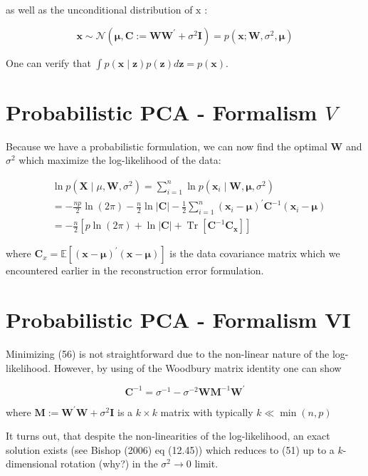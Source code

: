 \documentclass[11pt]{article}
\theoremstyle{plain} %
\theoremstyle{remark}
\begin{document}
as well as the unconditional distribution of $\mathrm{x}$ :

$$
\mathbf{x} \sim \mathcal{N}\left(\boldsymbol{\mu}, \mathbf{C}:=\mathbf{W} \mathbf{W}^{\prime}+\sigma^{2} \mathbf{I}\right)=p\left(\mathbf{x} ; \mathbf{W}, \sigma^{2}, \boldsymbol{\mu}\right)
$$

One can verify that $\int p(\mathbf{x} \mid \mathbf{z}) p(\mathbf{z}) d \mathbf{z}=p(\mathbf{x})$.

\section*{Probabilistic PCA - Formalism $V$}
Because we have a probabilistic formulation, we can now find the optimal $\mathbf{W}$ and $\sigma^{2}$ which maximize the log-likelihood of the data:

$$
\begin{aligned}
& \ln p\left(\mathbf{X} \mid \mu, \mathbf{W}, \sigma^{2}\right)=\sum_{i=1}^{n} \ln p\left(\mathbf{x}_{i} \mid \mathbf{W}, \boldsymbol{\mu}, \sigma^{2}\right) \\
& =-\frac{n p}{2} \ln (2 \pi)-\frac{n}{2} \ln |\mathbf{C}|-\frac{1}{2} \sum_{i=1}^{n}\left(\mathbf{x}_{i}-\boldsymbol{\mu}\right)^{\prime} \mathbf{C}^{-1}\left(\mathbf{x}_{i}-\boldsymbol{\mu}\right) \\
& =-\frac{n}{2}\left[p \ln (2 \pi)+\ln |\mathbf{C}|+\operatorname{Tr}\left[\mathbf{C}^{-1} \mathbf{C}_{\mathbf{x}}\right]\right]
\end{aligned}
$$

where $\mathbf{C}_{x}=\mathbb{E}\left[(\mathbf{x}-\boldsymbol{\mu})^{\prime}(\mathbf{x}-\boldsymbol{\mu})\right]$ is the data covariance matrix which we encountered earlier in the reconstruction error formulation.

\section*{Probabilistic PCA - Formalism VI}
Minimizing (56) is not straightforward due to the non-linear nature of the log-likelihood. However, by using of the Woodbury matrix identity one can show

$$
\mathbf{C}^{-1}=\sigma^{-1}-\sigma^{-2} \mathbf{W} \mathbf{M}^{-1} \mathbf{W}^{\prime}
$$

where $\mathbf{M}:=\mathbf{W}^{\prime} \mathbf{W}+\sigma^{2} \mathbf{I}$ is a $k \times k$ matrix with typically $k \ll \min (n, p)$

It turns out, that despite the non-linearities of the log-likelihood, an exact solution exists (see Bishop (2006) eq (12.45)) which reduces to (51) up to a $k$-dimensional rotation (why?) in the $\sigma^{2} \rightarrow 0$ limit.
\end{document}
